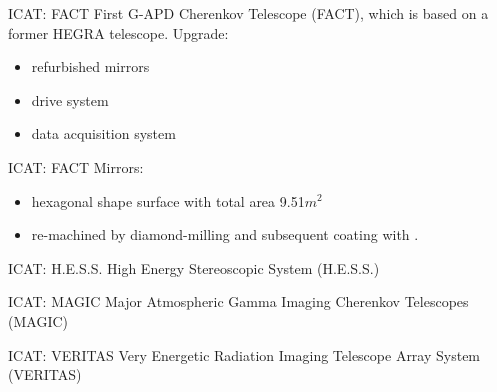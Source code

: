 \documentclass{beamer}
\begin{document}




\begin{frame}{ICAT: FACT}
	First G-APD Cherenkov Telescope (FACT), which is based on a former HEGRA telescope.
	\newline
	Upgrade:
	\begin{itemize}
		\item refurbished mirrors
		\item drive system
		\item data acquisition system
	\end{itemize}
\end{frame}


\begin{frame}{ICAT: FACT}
	Mirrors:
	\begin{itemize}
		\item hexagonal shape surface with total area 9.51$m^2$
		\item re-machined by diamond-milling and subsequent coating with .
	\end{itemize}
\end{frame}

\begin{frame}{ICAT: H.E.S.S.}
	High Energy Stereoscopic System (H.E.S.S.)
\end{frame}


\begin{frame}{ICAT: MAGIC}
	Major Atmospheric Gamma Imaging Cherenkov Telescopes (MAGIC)
\end{frame}


\begin{frame}{ICAT: VERITAS}
	Very Energetic Radiation Imaging Telescope Array System (VERITAS)
\end{frame}
\end{document}
